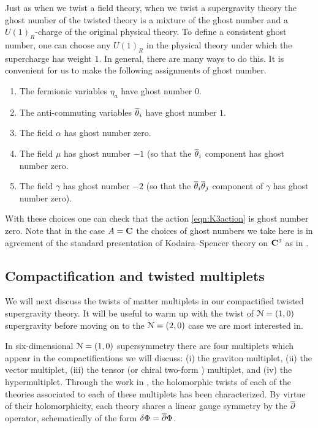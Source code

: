 \documentclass[../main.tex]{subfiles}
\begin{document}
Just as when we twist a field theory, when we twist a supergravity theory the ghost number of the twisted theory  is a mixture of the ghost number and a $U(1)_R$-charge of the original physical theory. To define a consistent ghost number, one can choose any $U(1)_R$ in the physical theory under which the supercharge has weight $1$.  In general, there are many ways to do this.  It is convenient for us to make the following assignments of ghost number.
\begin{enumerate} 
	\item The fermionic variables $\eta_a$ have ghost number $0$.
	\item The anti-commuting variables $\overline{\theta}_i$ have ghost number $1$.
	\item The field $\alpha$ has ghost number zero.
	\item The field $\mu$ has ghost number $-1$ (so that the $\overline \theta_i$ component has ghost number zero.
	\item The field $\gamma$ has ghost number $-2$ (so that the $\overline \theta_i \overline \theta_j$ component of $\gamma$ has ghost number zero).
\end{enumerate}
With these choices one can check that the action \eqref{eqn:K3action} is ghost number zero.
Note that in the case $A = \mathbf{C}$ the choices of ghost numbers we take here is in agreement of the standard presentation of Kodaira--Spencer theory on $\mathbf{C}^3$ as in \cite{CostelloGaiotto}.

\subsection{Compactification and twisted multiplets}

We will next discuss the twists of matter multiplets in our compactified twisted supergravity theory. It will be useful to warm up with the twist of $\mathcal{N}=(1, 0)$ supergravity before moving on to the $\mathcal{N}=(2, 0)$ case we are most interested in.

In six-dimensional $\mathcal{N}=(1,0)$ supersymmetry there are four multiplets which appear in the compactifications we will discuss: (i) the graviton multiplet, (ii) the vector multiplet, (iii) the tensor (or chiral two-form \cite{WittenM5}) multiplet, and (iv) the hypermultiplet.
Through the work in \cite{...}, the holomorphic twists of each of the theories associated to each of these multiplets has been characterized.
By virtue of their holomorphicity, each theory shares a linear gauge symmetry by the $\overline{\partial}$ operator, schematically of the form $\delta \Phi = \overline{\partial} \Phi$.
\end{document}
